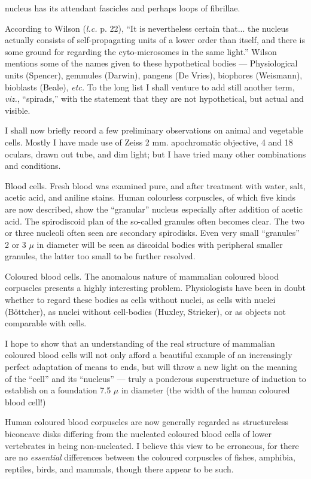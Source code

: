 \documentclass[a4paper, 12pt, oneside]{article}
\begin{document}
nucleus has its attendant fascicles and perhaps loops of fibrillae.

According to Wilson (\emph{l.c.} p. 22), ``It is nevertheless certain that... the nucleus actually consists of self-propagating units of a lower order than itself, and there is some ground for regarding the cyto-microsomes in the same light.'' Wilson mentions some of the names given to these hypothetical bodies --- Physiological units (Spencer), gemmules (Darwin), pangens (De Vries), biophores (Weismann), bioblasts (Beale), \emph{etc.} To the long list I shall venture to add still another term, \emph{viz.}, ``spirads,'' with the statement that they are not hypothetical, but actual and visible.

I shall now briefly record a few preliminary observations on animal and vegetable cells. Mostly I have made use of Zeiss 2 mm. apochromatic objective, 4 and 18 oculars, drawn out tube, and dim light; but I have tried many other combinations and conditions.

Blood cells. Fresh blood was examined pure, and after treatment with water, salt, acetic acid, and aniline stains. Human colourless corpuscles, of which five kinds are now described, show the ``granular'' nucleus especially after addition of acetic acid. The spirodiscoid plan of the so-called granules often becomes clear. The two or three nucleoli often seen are secondary spirodisks. Even very small ``granules'' 2 or 3 $\mu$ in diameter will be seen as discoidal bodies with peripheral smaller granules, the latter too small to be further resolved.

Coloured blood cells. The anomalous nature of mammalian coloured blood corpuscles presents a highly interesting problem. Physiologists have been in doubt whether to regard these bodies as cells without nuclei, as cells with nuclei (Böttcher), as nuclei without cell-bodies (Huxley, Strieker), or as objects not comparable with cells.

I hope to show that an understanding of the real structure of mammalian coloured blood cells will not only afford a beautiful example of an increasingly perfect adaptation of means to ends, but will throw a new light on the meaning of the ``cell'' and its ``nucleus'' --- truly a ponderous superstructure of induction to establish on a foundation 7.5 $\mu$ in diameter (the width of the human coloured blood cell!)

Human coloured blood corpuscles are now generally regarded as structureless biconcave disks differing from the nucleated coloured blood cells of lower vertebrates in being non-nucleated. I believe this view to be erroneous, for there are no \emph{essential} differences between the coloured corpuscles of fishes, amphibia, reptiles, birds, and mammals, though there appear to be such.
\end{document}
